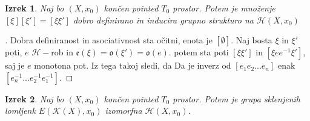 \documentclass[a4paper,12pt]{article}
\DeclareRobustCommand{\k}{
    \mathcal{K}
}
\DeclareRobustCommand{\h}{
    \mathcal{H}
}
\theoremstyle{definition}
\theoremstyle{plain}
\newtheorem{izrek}{Izrek}
\theoremstyle{definition}
\theoremstyle{plain}
\theoremstyle{plain}
\theoremstyle{plain}
\theoremstyle{plain}
\newenvironment{dokaz}{\begin{proof}[\bfseries\upshape\proofname]}{\end{proof}}
\begin{document}
\begin{izrek}
    Naj bo $(X,x_0)$ končen pointed $T_0$ prostor. Potem je množenje $[\xi][\xi']=[\xi\xi']$ dobro definirano in inducira grupno strukturo na $\mathscr{H}(X,x_0)$
\end{izrek}

\begin{dokaz}
    Dobra definiranost in asociativnost sta očitni, enota je $[\emptyset]$. Naj bosta $\xi$ in $\xi'$ poti, $e$ $\h-$rob in $\mathfrak{e}(\xi)=\mathfrak{o}(\xi')=\mathfrak{o}(e)$. potem sta poti $[\xi \xi']$ in $[\xi e e^{-1} \xi']$, saj je $e$ monotona pot. Iz tega takoj sledi, da Da je inverz od $[e_1 e_2...e_n]$ enak $[e_n^{-1}...e_2^{-1}e_1^{-1}]$.
\end{dokaz}


\begin{izrek}
    Naj bo $(X,x_0)$ končen pointed $T_0$ prostor. Potem je grupa sklenjenih lomljenk $E(\k(X),x_0)$ izomorfna $\mathscr{H}(X,x_0)$.
\end{izrek}
\end{document}
